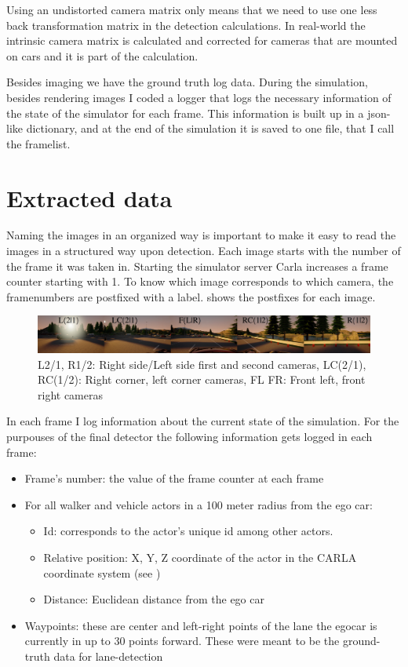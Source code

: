 Using an undistorted camera matrix only means that we need to use one less back
transformation matrix in the detection calculations. In real-world the intrinsic
camera matrix is calculated and corrected for cameras that are mounted on cars
and it is part of the calculation.

Besides imaging we have the ground truth log data. During the simulation,
besides rendering images I coded a logger that logs the necessary information of
the state of the simulator for each frame. This information is built up in a
json-like dictionary, and at the end of the simulation it is saved to one file,
that I call the framelist.

\section{Extracted data}

Naming the images in an organized way is important to make it easy to read the
images in a structured way upon detection. Each image starts with the number of
the frame it was taken in. Starting the simulator server Carla increases a
frame counter starting with 1. To know which image corresponds to which camera,
the framenumbers are postfixed with a label.  shows the
postfixes for each image.

\begin{figure}[!ht]
    \centering
    \includegraphics[width=150mm, keepaspectratio]{figures/labeling.jpg}
    \caption{L2/1, R1/2: Right side/Left side first and second cameras, LC(2/1), RC(1/2): Right corner, left corner cameras, FL FR: Front left, front right cameras}
    \label{fig:labeling}
\end{figure}

In each frame I log information about the current state of the simulation. For
the purpouses of the final detector the following information gets logged in each frame:
\begin{itemize}
    \item Frame's number: the value of the frame counter at each frame
    \item For all walker and vehicle actors in a 100 meter radius from the ego car: 
    \begin{itemize}
        \item Id: corresponds to the actor's unique id among other actors.
        \item Relative position: X, Y, Z coordinate of the actor in the CARLA
        coordinate system (see )
        \item Distance: Euclidean distance from the ego car 
      \end{itemize}
    \item Waypoints: these are center and left-right points of the lane the egocar is currently in up
    to 30 points forward. These were meant to be the ground-truth data for
    lane-detection
\end{itemize}

